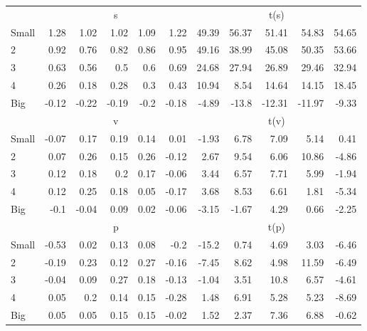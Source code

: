 \begin{table}[!ht]
\begin{tabular}{lrrrrrrrrrr}
      & \multicolumn{5}{c}{s} & \multicolumn{5}{c}{t(s)}
    
    \\
      \cmidrule(r){2-6} \cmidrule(r){7-11}

    Small   & 1.28  & 1.02  & 1.02  & 1.09  & 1.22  & 49.39  & 56.37  & 51.41  & 54.83  & 54.65  \\
         2  & 0.92  & 0.76  & 0.82  & 0.86  & 0.95  & 49.16  & 38.99  & 45.08  & 50.35  & 53.66  \\
         3  & 0.63  & 0.56  & 0.5  & 0.6  & 0.69  & 24.68  & 27.94  & 26.89  & 29.46  & 32.94  \\
         4  & 0.26  & 0.18  & 0.28  & 0.3  & 0.43  & 10.94  & 8.54  & 14.64  & 14.15  & 18.45  \\
    Big     & -0.12  & -0.22  & -0.19  & -0.2  & -0.18  & -4.89  & -13.8  & -12.31  & -11.97  & -9.33  \\

  
    
      & \multicolumn{5}{c}{v} & \multicolumn{5}{c}{t(v)}
    
    \\
      \cmidrule(r){2-6} \cmidrule(r){7-11}

    Small   & -0.07  & 0.17  & 0.19  & 0.14  & 0.01  & -1.93  & 6.78  & 7.09  & 5.14  & 0.41  \\
         2  & 0.07  & 0.26  & 0.15  & 0.26  & -0.12  & 2.67  & 9.54  & 6.06  & 10.86  & -4.86  \\
         3  & 0.12  & 0.18  & 0.2  & 0.17  & -0.06  & 3.44  & 6.57  & 7.71  & 5.99  & -1.94  \\
         4  & 0.12  & 0.25  & 0.18  & 0.05  & -0.17  & 3.68  & 8.53  & 6.61  & 1.81  & -5.34  \\
    Big     & -0.1  & -0.04  & 0.09  & 0.02  & -0.06  & -3.15  & -1.67  & 4.29  & 0.66  & -2.25  \\

  
    
      & \multicolumn{5}{c}{p} & \multicolumn{5}{c}{t(p)}
    
    \\
      \cmidrule(r){2-6} \cmidrule(r){7-11}

    Small   & -0.53  & 0.02  & 0.13  & 0.08  & -0.2  & -15.2  & 0.74  & 4.69  & 3.03  & -6.46  \\
         2  & -0.19  & 0.23  & 0.12  & 0.27  & -0.16  & -7.45  & 8.62  & 4.98  & 11.59  & -6.49  \\
         3  & -0.04  & 0.09  & 0.27  & 0.18  & -0.13  & -1.04  & 3.51  & 10.8  & 6.57  & -4.61  \\
         4  & 0.05  & 0.2  & 0.14  & 0.15  & -0.28  & 1.48  & 6.91  & 5.28  & 5.23  & -8.69  \\
    Big     & 0.05  & 0.05  & 0.15  & 0.15  & -0.02  & 1.52  & 2.37  & 7.36  & 6.88  & -0.62  \\


\end{tabular}
\end{table}
